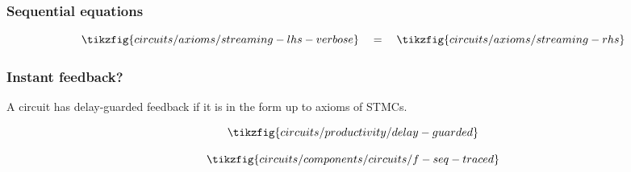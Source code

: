 \begin{frame}
    \frametitle{Sequential equations}

    \[
        \tikzfig{circuits/axioms/streaming-lhs-verbose}
        \quad=\quad
        \tikzfig{circuits/axioms/streaming-rhs}    
    \]
\end{frame}

\begin{frame}
    \frametitle{Instant feedback?}

    A circuit has \alert{delay-guarded feedback} if it is in the form \alert{up to axioms of STMCs}. 

    \[
        \tikzfig{circuits/productivity/delay-guarded}  
    \]

    \[
        \tikzfig{circuits/components/circuits/f-seq-traced}    
    \]
    


\end{frame}

